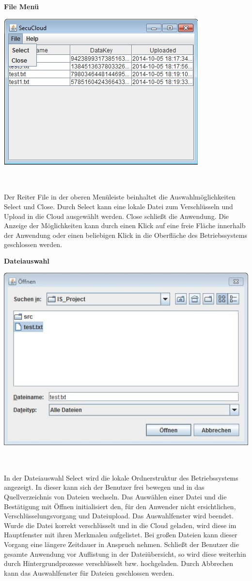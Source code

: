 \documentclass[12pt,a4paper,bibliography=totocnumbered,listof=totocnumbered]{scrartcl}
\begin{document}
\textbf{File Menü}
\vspace{1em}
$\;$\\
\begin{minipage}{\linewidth}
	\centering
	\includegraphics[width=0.4\linewidth]{File.jpg}
	\label{File}
\end{minipage}
\\\\Der Reiter File in der oberen Menüleiste beinhaltet die Auswahlmöglichkeiten Select und Close. Durch Select kann eine lokale Datei zum Verschlüsseln und Upload in die Cloud ausgewählt werden. Close schließt die Anwendung. Die Anzeige der Möglichkeiten kann durch einen Klick auf eine freie Fläche innerhalb der Anwendung oder einen beliebigen Klick in die Oberfläche des Betriebssystems geschlossen werden.

\textbf{Dateiauswahl}
\vspace{1em}
$\;$\\
\begin{minipage}{\linewidth}
	\centering
	\includegraphics[width=0.4\linewidth]{Select.jpg}
	\label{Select}
\end{minipage}
\\\\In der Dateiauswahl Select wird die lokale Ordnerstruktur des Betriebssystems angezeigt. In dieser kann sich der Benutzer frei bewegen und in das Quellverzeichnis von Dateien wechseln. Das Auswählen einer Datei und die Bestätigung mit Öffnen initialisiert den, für den Anwender nicht ersichtlichen, Verschlüsselungsvorgang und Dateiupload. Das Auswahlfenster wird beendet. Wurde die Datei korrekt verschlüsselt und in die Cloud geladen, wird diese im Hauptfenster mit ihren Merkmalen aufgelistet. Bei großen Dateien kann dieser Vorgang eine längere Zeitdauer in Anspruch nehmen. Schließt der Benutzer die gesamte Anwendung vor Auflistung in der Dateiübersicht, so wird diese weiterhin durch Hintergrundprozesse verschlüsselt bzw. hochgeladen. Durch Abbrechen kann das Auswahlfenster für Dateien geschlossen werden.
\end{document}
